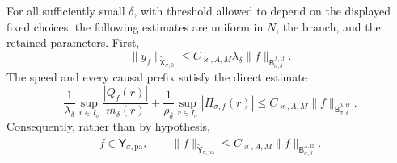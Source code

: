 \begin{proposition}
For all sufficiently small \(\delta\), with threshold allowed to depend
on the displayed fixed choices, the following estimates are uniform in
\(N\), the branch, and the retained parameters.  First,
\begin{equation}
 \|y_f\|_{\widetilde{\mathsf X}_{\sigma,0}}
 \le C_{\varkappa,A,M}\lambda_\delta
        \|f\|_{\mathsf B_{\sigma,\delta}^{\lambda,\mathrm{tf}}}.
                                                        \label{eq:bulk-global-normal-bound}
\end{equation}
The speed and every causal prefix satisfy the direct estimate
\begin{equation}
 \frac1{\lambda_\delta}
   \sup_{r\in I_\sigma}\frac{|Q_f(r)|}{m_\delta(r)}
 +\frac1{\rho_\delta}
   \sup_{r\in I_\sigma}|\Pi_{\sigma,f}(r)|
 \le C_{\varkappa,A,M}
       \|f\|_{\mathsf B_{\sigma,\delta}^{\lambda,\mathrm{tf}}}.
                                                        \label{eq:bulk-direct-prefix-bound}
\end{equation}
Consequently, rather than by hypothesis,
\begin{equation}
 f\in\widetilde{\mathsf Y}_{\sigma,\mathrm{pa}},\qquad
 \|f\|_{\widetilde{\mathsf Y}_{\sigma,\mathrm{pa}}}
 \le C_{\varkappa,A,M}
       \|f\|_{\mathsf B_{\sigma,\delta}^{\lambda,\mathrm{tf}}}.
                                                        \label{eq:bulk-direct-graph-embedding}
\end{equation}


\end{proposition}
